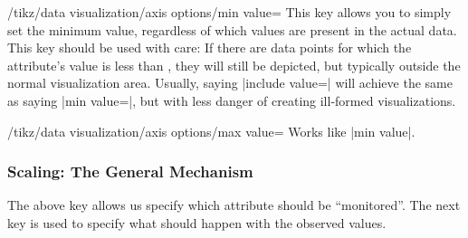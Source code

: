 \begin{key}{/tikz/data visualization/axis options/min value=}
  This key allows you to simply set the minimum value, regardless of
  which values are present in the actual data. This key should be used
  with care: If there are data points for which the attribute's value
  is less than , they will still be depicted, but
  typically outside the normal visualization area. Usually, saying
  |include value=| will achieve the same as saying
  |min value=|, but with less danger of creating
  ill-formed visualizations.
\end{key}

\begin{key}{/tikz/data visualization/axis options/max value=}
  Works like |min value|.
\end{key}


\subsubsection{Scaling: The General Mechanism}

The above key allows us specify which attribute should be
``monitored''. The next key is used to specify what should happen with
the observed values.

